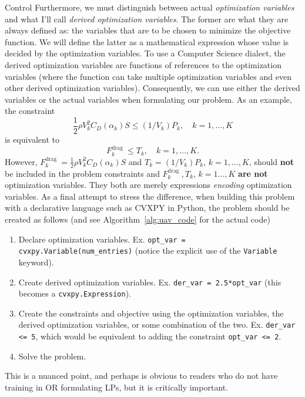 \begin{chapter}{Control}
    Furthermore,
    we must distinguish between actual \textit{optimization variables} and what I'll call \textit{derived optimization variables}.
    The former are what they are always defined as: the variables that are to be chosen to minimize the objective function.
    We will define the latter as a mathematical expression whose value is decided by the optimization variables.
    To use a Computer Science dialect, the derived optimization variables are functions of references to the optimization variables
    (where the function can take multiple optimization variables and even other derived optimization variables).
    Consequently, we can use either the derived variables or the actual variables when formulating our problem.
    As an example, the constraint
    \[\frac{1}{2} \rho V_k^2 C_D\left(\alpha_k\right) S \le \left(1/V_k \right)P_k, \quad k = 1, \ldots, K\]
    is equivalent to
    \[F_k^{\text {drag }} \le T_k, \quad k=1, \ldots, K.\]
    However, $F_k^{\text {drag }} = \frac{1}{2} \rho V_k^2 C_D\left(\alpha_k\right) S$ and $T_k = \left(1/V_k \right)P_k$, $k = 1, \ldots, K$,
    should \textbf{not} be included in the problem constraints and $F_k^{\text {drag }}, T_k$, $k=1\ldots, K$ 
    \textbf{are not} optimization variables. They both are merely expressions \textit{encoding} optimization variables.
    As a final attempt to stress the difference, when building this problem with a declarative language such as CVXPY in Python,
    the problem should be created as follows (and see Algorithm~\ref{alg:uav_code} for the actual code)
    \begin{enumerate}
        \item Declare optimization variables. Ex. \lstinline|opt_var = cvxpy.Variable(num_entries)| (notice the explicit
        use of the \lstinline|Variable| keyword).
        \item Create derived optimization variables. Ex. \lstinline|der_var = 2.5*opt_var| (this becomes a \lstinline|cvxpy.Expression|).
        \item Create the constraints and objective using the optimization variables,
        the derived optimization variables, or some combination of the two. Ex. \lstinline|der_var <= 5|,
        which would be equivalent to adding the constraint \lstinline|opt_var <= 2|.
        \item Solve the problem.
    \end{enumerate}
    This is a nuanced point, and perhaps is obvious
    to readers who do not have training in OR formulating LPs, but it is critically important.


\end{chapter}
